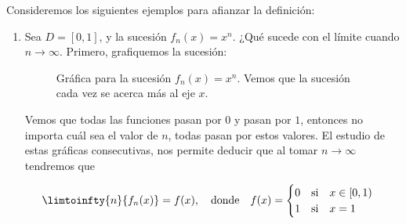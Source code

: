 \begin{ejem}\label{ejem:cp}
    Consideremos los siguientes ejemplos para afianzar la definición:
    
    \begin{enumerate}
        \item Sea $D = [0,1]$, y la sucesión $f_n(x) = x^n$. ¿Qué sucede con el límite cuando $n \rightarrow \infty$. Primero, grafiquemos la sucesión:
        
        \begin{figure}
            \centering
            \label{fig:ej4.1}
            \caption{\footnotesize Gráfica para la sucesión $f_n(x) = x^n$. Vemos que la sucesión cada vez se acerca más al eje $x$.}
        \end{figure}
        
        Vemos que todas las funciones pasan por $0$ y pasan por $1$, entonces no importa cuál sea el valor de $n$, todas pasan por estos valores. El estudio de estas gráficas consecutivas, nos permite deducir que al tomar $n \rightarrow \infty$ tendremos que
        
        \[
        \limtoinfty{n}{f_n(x)} = f(x), \quad \text{donde} \quad f(x)=\begin{cases}
        0 \quad \text{si} \quad x \in [0,1) \\
        1 \quad \text{si} \quad x = 1
        \end{cases}
        \]
        

\end{enumerate}
\end{ejem}
